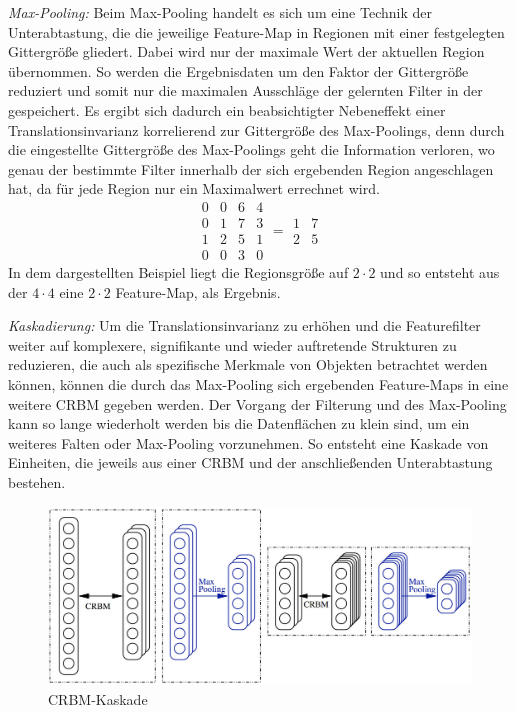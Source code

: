 \textit{Max-Pooling:}
Beim Max-Pooling handelt es sich um eine Technik der Unterabtastung, die die jeweilige Feature-Map in Regionen mit einer festgelegten Gittergröße gliedert. 
Dabei wird nur der maximale Wert der aktuellen Region übernommen.
So werden die Ergebnisdaten um den Faktor der Gittergröße reduziert und somit nur die maximalen Ausschläge der gelernten Filter in der gespeichert.
Es ergibt sich dadurch ein beabsichtigter Nebeneffekt einer Translationsinvarianz korrelierend zur Gittergröße des Max-Poolings, denn durch die eingestellte Gittergröße des Max-Poolings geht die Information verloren, wo genau der bestimmte Filter innerhalb der sich ergebenden Region angeschlagen hat, da für jede Region nur ein Maximalwert errechnet wird.\newline
\begin{equation*}
\begin{matrix}
 0 & 0 & 6 & 4 \\
 0 & 1 & 7 & 3 \\
 1 & 2 & 5 & 1 \\
 0 & 0 & 3 & 0
\end{matrix} =
\begin{matrix}
 1 & 7 \\
 2 & 5  
\end{matrix}
\end{equation*}
In dem dargestellten Beispiel liegt die Regionsgröße auf $2 \cdot 2$ und so entsteht aus der $4 \cdot 4$ eine $2 \cdot 2$ Feature-Map, als Ergebnis.  


\textit{Kaskadierung:}
Um die Translationsinvarianz zu erhöhen und die Featurefilter weiter auf komplexere, signifikante und wieder auftretende Strukturen zu reduzieren, die auch als spezifische Merkmale von Objekten betrachtet werden können, können die durch das Max-Pooling sich ergebenden Feature-Maps in eine weitere CRBM gegeben werden. 
Der Vorgang der Filterung und des Max-Pooling kann so lange wiederholt werden bis die Datenflächen zu klein sind, um ein weiteres Falten oder Max-Pooling vorzunehmen.
So entsteht eine Kaskade von Einheiten, die jeweils aus einer CRBM und der anschließenden Unterabtastung bestehen.\newline
\begin{figure}[!htbp]
		\includegraphics{images/stack.jpg}
		\caption{CRBM-Kaskade \cite{Norouzi09}}
\end{figure}
